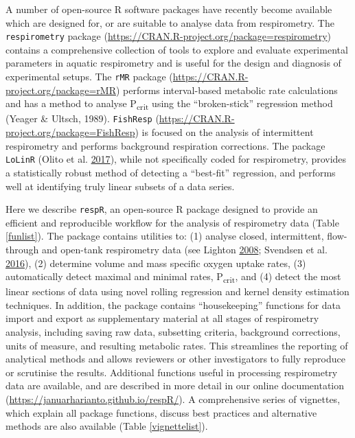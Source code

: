 \documentclass[a4paper,10pt, oneside]{memoir}
\begin{document}
A number of open-source R software packages have recently become available which are designed for, or are suitable to analyse data from respirometry.
The \texttt{respirometry} package (\url{https://CRAN.R-project.org/package=respirometry}) contains a comprehensive collection of tools to explore and evaluate experimental parameters in aquatic respirometry and is useful for the design and diagnosis of experimental setups.
The \texttt{rMR} package (\url{https://CRAN.R-project.org/package=rMR}) performs interval-based metabolic rate calculations and has a method to analyse P\textsubscript{crit} using the ``broken-stick'' regression method (Yeager \& Ultsch, 1989).
\texttt{FishResp} (\url{https://CRAN.R-project.org/package=FishResp}) is focused on the analysis of intermittent respirometry and performs background respiration corrections.
The package \texttt{LoLinR} (Olito et al. \protect\hyperlink{ref-Olito2017}{2017}), while not specifically coded for respirometry, provides a statistically robust method of detecting a ``best-fit'' regression, and performs well at identifying truly linear subsets of a data series.

Here we describe \texttt{respR}, an open-source R package designed to provide an efficient and reproducible workflow for the analysis of respirometry data (Table \ref{funlist}).
The package contains utilities to: (1) analyse closed, intermittent, flow-through and open-tank respirometry data (see Lighton \protect\hyperlink{ref-Lighton2008}{2008}; Svendsen et al. \protect\hyperlink{ref-Svendsen2016}{2016}), (2) determine volume and mass specific oxygen uptake rates, (3) automatically detect maximal and minimal rates, P\textsubscript{crit}, and (4) detect the most linear sections of data using novel rolling regression and kernel density estimation techniques.
In addition, the package contains ``housekeeping'' functions for data import and export as supplementary material at all stages of respirometry analysis, including saving raw data, subsetting criteria, background corrections, units of measure, and resulting metabolic rates.
This streamlines the reporting of analytical methods and allows reviewers or other investigators to fully reproduce or scrutinise the results.
Additional functions useful in processing respirometry data are available, and are described in more detail in our online documentation (\url{https://januarharianto.github.io/respR/}).
A comprehensive series of vignettes, which explain all package functions, discuss best practices and alternative methods are also available (Table \ref{vignettelist}).
\end{document}
